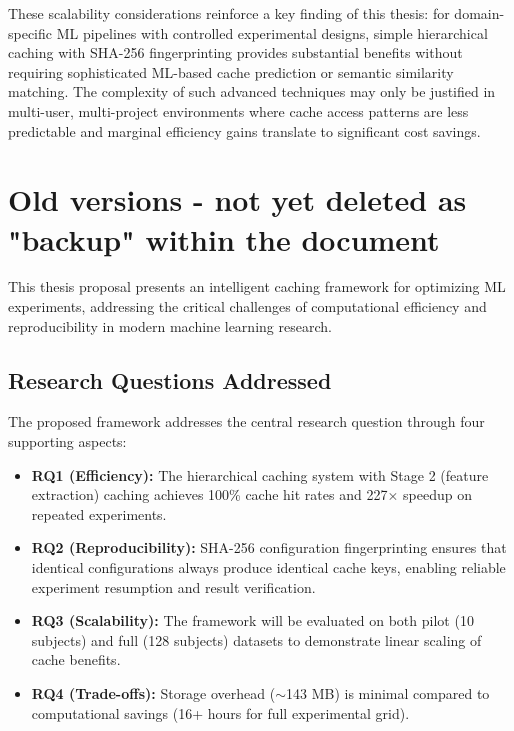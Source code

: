 \documentclass{imc-inf} %
\begin{document}
These scalability considerations reinforce a key finding of this thesis: for domain-specific ML pipelines with controlled experimental designs, simple hierarchical caching with SHA-256 fingerprinting provides substantial benefits without requiring sophisticated ML-based cache prediction or semantic similarity matching. The complexity of such advanced techniques may only be justified in multi-user, multi-project environments where cache access patterns are less predictable and marginal efficiency gains translate to significant cost savings.



\chapter{Old versions - not yet deleted as "backup" within the document}

This thesis proposal presents an intelligent caching framework for optimizing ML experiments, addressing the critical challenges of computational efficiency and reproducibility in modern machine learning research.

\section{Research Questions Addressed}

The proposed framework addresses the central research question through four supporting aspects:

\begin{itemize}
\item \textbf{RQ1 (Efficiency):} The hierarchical caching system with Stage 2 (feature extraction) caching achieves 100\% cache hit rates and 227$\times$ speedup on repeated experiments.

\item \textbf{RQ2 (Reproducibility):} SHA-256 configuration fingerprinting ensures that identical configurations always produce identical cache keys, enabling reliable experiment resumption and result verification.

\item \textbf{RQ3 (Scalability):} The framework will be evaluated on both pilot (10 subjects) and full (128 subjects) datasets to demonstrate linear scaling of cache benefits.

\item \textbf{RQ4 (Trade-offs):} Storage overhead ($\sim$143 MB) is minimal compared to computational savings (16+ hours for full experimental grid).
\end{itemize}
\end{document}
